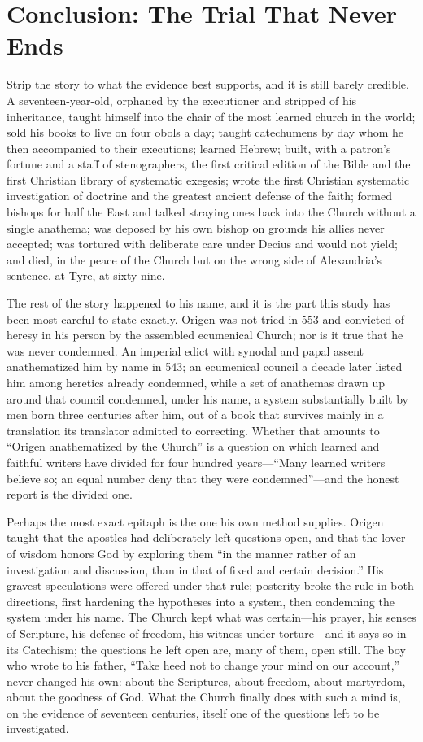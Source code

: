 \section{Conclusion: The Trial That Never Ends}

Strip the story to what the evidence best supports, and it is still barely
credible. A seventeen-year-old, orphaned by the executioner and stripped of
his inheritance, taught himself into the chair of the most learned church in
the world; sold his books to live on four obols a day; taught catechumens by
day whom he then accompanied to their executions; learned Hebrew; built, with
a patron's fortune and a staff of stenographers, the first critical edition
of the Bible and the first Christian library of systematic exegesis; wrote
the first Christian systematic investigation of doctrine and the greatest
ancient defense of the faith; formed bishops for half the East and talked
straying ones back into the Church without a single anathema; was deposed by
his own bishop on grounds his allies never accepted; was tortured with
deliberate care under Decius and would not yield; and died, in the peace of
the Church but on the wrong side of Alexandria's sentence, at Tyre, at
sixty-nine.

The rest of the story happened to his name, and it is the part this study
has been most careful to state exactly. Origen was not tried in 553 and
convicted of heresy in his person by the assembled ecumenical Church; nor is
it true that he was never condemned. An imperial edict with synodal and
papal assent anathematized him by name in 543; an ecumenical council a
decade later listed him among heretics already condemned, while a set of
anathemas drawn up around that council condemned, under his name, a system
substantially built by men born three centuries after him, out of a book
that survives mainly in a translation its translator admitted to correcting.
Whether that amounts to ``Origen anathematized by the Church'' is a question
on which learned and faithful writers have divided for four hundred
years---``Many learned writers believe so; an equal number deny that they
were condemned''---and the honest report is the divided one.

Perhaps the most exact epitaph is the one his own method supplies. Origen
taught that the apostles had deliberately left questions open, and that the
lover of wisdom honors God by exploring them ``in the manner rather of an
investigation and discussion, than in that of fixed and certain decision.''
His gravest speculations were offered under that rule; posterity broke the
rule in both directions, first hardening the hypotheses into a system,
then condemning the system under his name. The Church kept what was
certain---his prayer, his senses of Scripture, his defense of freedom, his
witness under torture---and it says so in its Catechism; the questions he
left open are, many of them, open still. The boy who wrote to his father,
``Take heed not to change your mind on our account,'' never changed his own:
about the Scriptures, about freedom, about martyrdom, about the goodness of
God. What the Church finally does with such a mind is, on the evidence of
seventeen centuries, itself one of the questions left to be investigated.
